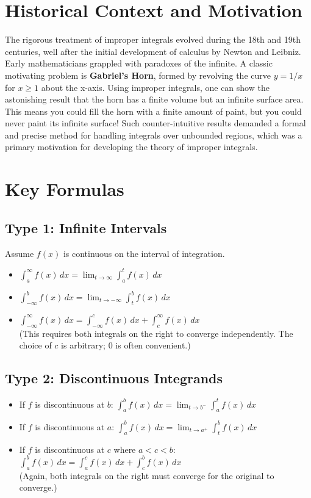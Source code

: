 \documentclass{article}
\begin{document}
\section{Historical Context and Motivation}
The rigorous treatment of improper integrals evolved during the 18th and 19th centuries, well after the initial development of calculus by Newton and Leibniz. Early mathematicians grappled with paradoxes of the infinite. A classic motivating problem is \textbf{Gabriel's Horn}, formed by revolving the curve $y=1/x$ for $x \ge 1$ about the x-axis. Using improper integrals, one can show the astonishing result that the horn has a finite volume but an infinite surface area. This means you could fill the horn with a finite amount of paint, but you could never paint its infinite surface! Such counter-intuitive results demanded a formal and precise method for handling integrals over unbounded regions, which was a primary motivation for developing the theory of improper integrals.

\section{Key Formulas}
\subsection{Type 1: Infinite Intervals}
Assume $f(x)$ is continuous on the interval of integration.
\begin{itemize}
    \item $\displaystyle \int_{a}^{\infty} f(x) \,dx = \lim_{t \to \infty} \int_{a}^{t} f(x) \,dx$
    \item $\displaystyle \int_{-\infty}^{b} f(x) \,dx = \lim_{t \to -\infty} \int_{t}^{b} f(x) \,dx$
    \item $\displaystyle \int_{-\infty}^{\infty} f(x) \,dx = \int_{-\infty}^{c} f(x) \,dx + \int_{c}^{\infty} f(x) \,dx$ \\ (This requires both integrals on the right to converge independently. The choice of $c$ is arbitrary; 0 is often convenient.)
\end{itemize}

\subsection{Type 2: Discontinuous Integrands}
\begin{itemize}
    \item If $f$ is discontinuous at $b$: $\displaystyle \int_{a}^{b} f(x) \,dx = \lim_{t \to b^{-}} \int_{a}^{t} f(x) \,dx$
    \item If $f$ is discontinuous at $a$: $\displaystyle \int_{a}^{b} f(x) \,dx = \lim_{t \to a^{+}} \int_{t}^{b} f(x) \,dx$
    \item If $f$ is discontinuous at $c$ where $a < c < b$: \\ $\displaystyle \int_{a}^{b} f(x) \,dx = \int_{a}^{c} f(x) \,dx + \int_{c}^{b} f(x) \,dx$ \\ (Again, both integrals on the right must converge for the original to converge.)
\end{itemize}
\end{document}
